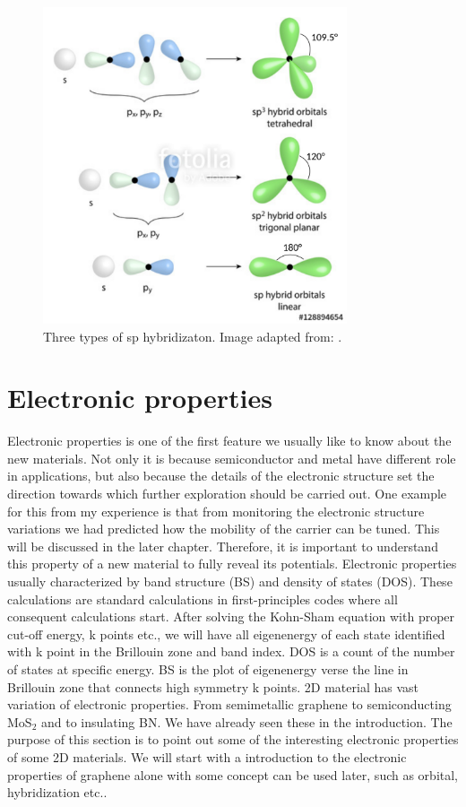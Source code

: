 \begin{figure}[htbp!] 
\centering  
\includegraphics[width=0.8\textwidth]{sp_hybrid.png}
\caption{Three types of sp hybridizaton. Image adapted from: \cite{sp_hybrid}. }  
\label{fig:sp_hybrid}
\end{figure} 


\section{Electronic properties}

Electronic properties is one of the first feature we usually like to know about the new materials. Not only it is because semiconductor and metal have different role in applications, but also because the details of the electronic structure set the direction towards which further exploration should be carried out. One example for this from my experience is that from monitoring the electronic structure variations we had predicted how the mobility of the carrier can be tuned. This will be discussed in the later chapter. Therefore, it is important to understand this property of a new material to fully reveal its potentials. Electronic properties usually characterized by band structure (BS) and density of states (DOS). These calculations are standard calculations in first-principles codes where all consequent calculations start. After solving the Kohn-Sham equation with proper cut-off energy, k points etc., we will have all eigenenergy of each state identified with k point in the Brillouin zone and band index.  DOS is a count of the number of states at specific energy. BS is the plot of eigenenergy verse the line in Brillouin zone that connects high symmetry k points.  2D material has vast variation of electronic properties. From semimetallic graphene to semiconducting MoS$_2$ and to insulating BN. We have already seen these in the introduction. The purpose of this section is to point out some of the interesting electronic properties of some 2D materials. We will start with a introduction to the electronic properties of graphene alone with some concept can be used later, such as orbital, hybridization etc..

